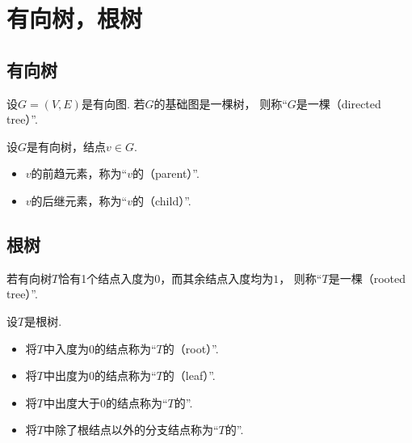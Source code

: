 \section{有向树，根树}
\subsection{有向树}
\begin{definition}
设\(G = (V,E)\)是有向图.
若\(G\)的基础图是一棵树，
则称“\(G\)是一棵（directed tree）”.
\end{definition}

\begin{definition}
设\(G\)是有向树，结点\(v \in G\).
\begin{itemize}
	\item \(v\)的前趋元素，称为“\(v\)的（parent）”.
	\item \(v\)的后继元素，称为“\(v\)的（child）”.
\end{itemize}
\end{definition}

\subsection{根树}
\begin{definition}
若有向树\(T\)恰有1个结点入度为\(0\)，而其余结点入度均为\(1\)，
则称“\(T\)是一棵（rooted tree）”.
\end{definition}

\begin{definition}
设\(T\)是根树.
\begin{itemize}
	\item 将\(T\)中入度为\(0\)的结点称为“\(T\)的（root）”.
	\item 将\(T\)中出度为\(0\)的结点称为“\(T\)的（leaf）”.
	\item 将\(T\)中出度大于\(0\)的结点称为“\(T\)的”.
	\item 将\(T\)中除了根结点以外的分支结点称为“\(T\)的”.
\end{itemize}
\end{definition}

